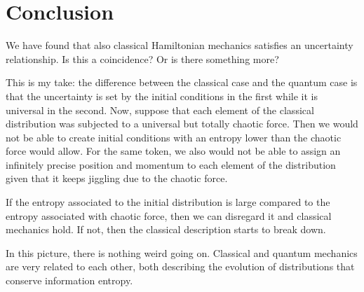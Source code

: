 \documentclass[aps,pra,10pt,floatfix,nofootinbib]{revtex4-1}
\theoremstyle{definition}
\begin{document}
\section{Conclusion}

We have found that also classical Hamiltonian mechanics satisfies an uncertainty relationship. Is this a coincidence? Or is there something more?

This is my take: the difference between the classical case and the quantum case is that the uncertainty is set by the initial conditions in the first while it is universal in the second. Now, suppose that each element of the classical distribution was subjected to a universal but totally chaotic force. Then we would not be able to create initial conditions with an entropy lower than the chaotic force would allow. For the same token, we also would not be able to assign an infinitely precise position and momentum to each element of the distribution given that it keeps jiggling due to the chaotic force.

If the entropy associated to the initial distribution is large compared to the entropy associated with chaotic force, then we can disregard it and classical mechanics hold. If not, then the classical description starts to break down.

In this picture, there is nothing weird going on. Classical and quantum mechanics are very related to each other, both describing the evolution of distributions that conserve information entropy.
\end{document}
